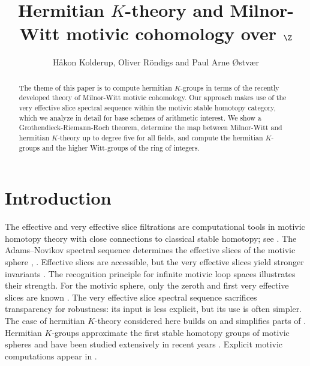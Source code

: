 \documentclass[11pt,hyp,english]{article}
\author{H{\aa}kon Kolderup, Oliver R\"ondigs and Paul Arne {\O}stv{\ae}r}
\title{Hermitian $K$-theory and Milnor-Witt motivic cohomology over $\Z$}
\theoremstyle{definition}
\begin{document}
\maketitle
\begin{abstract}
\noindent 
The theme of this paper is to compute hermitian $K$-groups in terms of 
the recently developed theory of Milnor-Witt motivic cohomology.
Our approach makes use of the very effective slice spectral sequence within the motivic stable homotopy category, 
which we analyze in detail for base schemes of arithmetic interest.
We show a Grothendieck-Riemann-Roch theorem, 
determine the map between Milnor-Witt and hermitian $K$-theory up to degree five for all fields, 
and compute the hermitian $K$-groups and the higher Witt-groups of the ring of integers.
\end{abstract}
\tableofcontents


\newpage
\section{Introduction}
\label{section:introduction}

The effective and very effective slice filtrations are computational tools in motivic homotopy theory with close connections to classical stable homotopy; see \cite{zbMATH07303324,levine.comparison,zbMATH02078162}. The Adams–Novikov spectral sequence determines the effective slices of the motivic sphere \cite[Conjecture 8.1]{levine.comparison}, \cite[Theorem 2.12]{zbMATH07003144}. Effective slices are accessible, but the very effective slices yield stronger invariants \cite{SO:twisted}. The recognition principle for infinite motivic loop spaces \cite{zbMATH07422194,zbMATH07733647} illustrates their strength. For the motivic sphere, only the zeroth and first very effective slices are known \cite[Theorem 3.30]{2020arXiv200506778B}.
The very effective slice spectral sequence sacrifices transparency for robustness: its input is less explicit, but its use is often simpler. The case of hermitian $K$-theory considered here builds on \cite{Bachmann} and simplifies parts of \cite{KRO}. Hermitian $K$-groups approximate the first stable homotopy groups of motivic spheres \cite{MorelICM06,zbMATH07003144,zbMATH07858209} and have been studied extensively in recent years \cite{9.I,9.II,9.III,dfjk,2019arXiv191111682H,zbMATH07623470}. Explicit motivic computations appear in \cite{berrick-karoubi,zbMATH05840069,zbMATH06261120,zbMATH05930233,zbMATH06433290,zbMATH07585647,zbMATH07352278,KRO,zbMATH07124513}.
\end{document}
